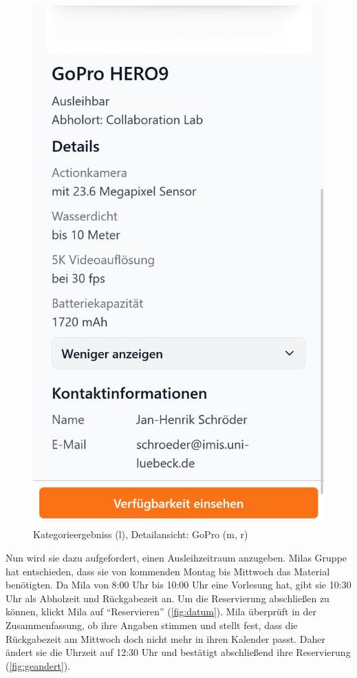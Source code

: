 \begin{figure}[p]
    \includegraphics[scale=0.17]{Bilder/Dialgobeispiel/Details 2.png}
    \caption[Dialogbeispiel 1]{Kategorieergebniss (l), Detailansicht: GoPro (m, r)}\label{fig:suchen}
\end{figure}

\newpage
Nun wird sie dazu aufgefordert, einen Ausleihzeitraum anzugeben. Milas Gruppe
hat entschieden, dass sie von kommenden Montag bis Mittwoch das Material
benötigten. Da Mila von 8:00 Uhr bis 10:00 Uhr eine Vorlesung hat, gibt sie
10:30 Uhr als Abholzeit und Rückgabezeit an. Um die Reservierung abschließen zu
können, klickt Mila auf \enquote{Reservieren} (\ref{fig:datum}). Mila überprüft in der
Zusammenfassung, ob ihre Angaben stimmen und stellt fest, dass die Rückgabezeit
am Mittwoch doch nicht mehr in ihren Kalender passt. Daher ändert sie die
Uhrzeit auf 12:30 Uhr und bestätigt abschließend ihre Reservierung (\ref{fig:geandert}).

